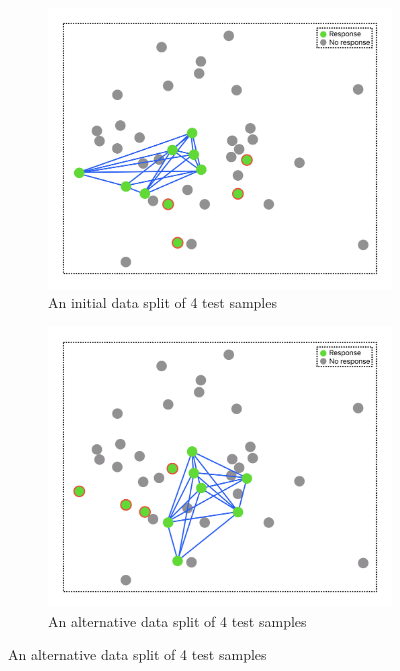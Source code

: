 \documentclass[12pt,a4paper]{report}
\begin{document}
\begin{figure}[h!] 
    \centering 

    \begin{subfigure}[b]{0.49\textwidth}
        \centering
        \includegraphics[width=\textwidth]{images/split_problem_1.png} 
        \caption{An initial data split of 4 test samples} 
        \label{fig:split_problem_1}
    \end{subfigure}
    \hfill
    \begin{subfigure}[b]{0.49\textwidth}
        \centering
        \includegraphics[width=\linewidth]{images/split_problem_2.png}
        \caption{An alternative data split of 4 test samples} 
        \label{fig:split_problem_2} 
    \end{subfigure}


\end{figure}
\end{document}
